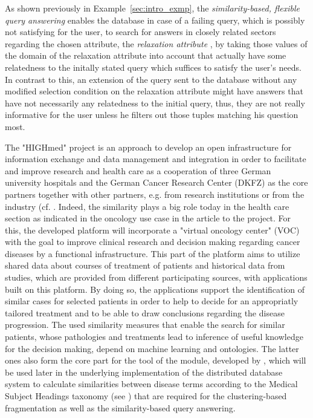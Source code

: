 As shown previously in Example~\ref{sec:intro_exmp}, the \emph{similarity-based, flexible query answering} \citep{Wiese2014} enables the database in case 
of a failing query, which is possibly not satisfying for the user, to search for answers in closely related sectors regarding the chosen attribute, 
the \emph{relaxation attribute} \citep{Wiese2014}, by taking those values of the domain of the relaxation attribute into account that actually have some 
relatedness to the initally stated query which suffices to satisfy the user's needs. In contrast to this, an extension of the query sent to the
database without any modified selection condition on the relaxation attribute might have answers that have not necessarily any relatedness to the initial
query, thus, they are not really informative for the user unless he filters out those tuples matching his question most.


The "HIGHmed" project \citep{Haarbrandt2018} is an approach to develop an open infrastructure for information exchange and data management and integration
in order to facilitate and improve research and health care as a cooperation of three German university hospitals and the German Cancer Research Center
(DKFZ) as the core partners together with other partners, e.g. from research institutions or from the industry (cf. \cite[Table~2]{Haarbrandt2018}.
Indeed, the similarity plays a big role today in the health care section as indicated in the oncology use case in the article to the project.
For this, the developed platform will incorporate a "virtual oncology center" (VOC) \citep{Haarbrandt2018} with the goal to improve clinical research and 
decision making regarding cancer diseases by a functional infrastructure. This part of the platform aims to utilize shared data about courses of
treatment of patients and historical data from studies, which are provided from different participating sources, with applications built on this platform.
By doing so, the applications support the identification of similar cases for selected patients in order to help to decide for an appropriatly tailored
treatment and to be able to draw conclusions regarding the disease progression. The used similarity measures that enable the search for similar patients,
whose pathologies and treatments lead to inference of useful knowledge for the decision making, depend on machine learning and ontologies. The latter ones
also form the core part for the tool of the  module, developed by \cite{McInnes2009}, which will be used later in the underlying
implementation of the distributed database system to calculate similarities between disease terms according to the Medical Subject Headings taxonomy 
(see ) that are required for the clustering-based fragmentation as well as the similarity-based query answering.


